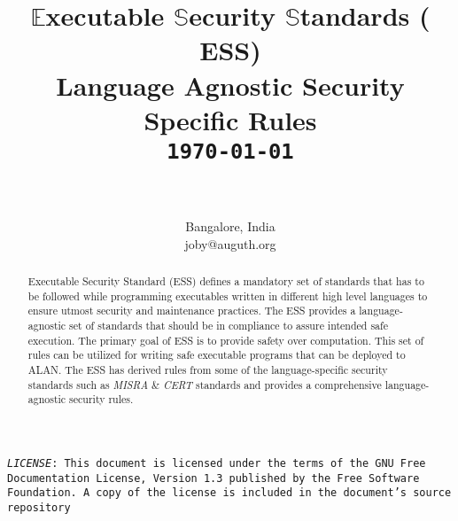 \documentclass[9pt]{IEEEtran} %
\begin{document}
\title{$\mathbb{E}$xecutable $\mathbb{S}$ecurity $\mathbb{S}$tandards (${\mathbf{ESS}}$) \\ \vspace{3mm} \normalsize{Language Agnostic Security Specific Rules} \vspace{2mm} \\ \textbf{\texttt{\today}} \vspace{1mm} }

\author{ \\
 \\
\normalsize{Bangalore, India \\
joby@auguth.org} \vspace{-5mm} \\
}

\maketitle

\normalsize

\begin{center}
\begin{spacing}{0.8}
\begin{justify}
\texttt{\scriptsize{\textit{LICENSE}: \texttt{This document is licensed under the terms of the GNU Free Documentation License, Version 1.3 published by the Free Software Foundation. A copy of the license is included in the document's source repository}}}
\end{justify}
\end{spacing}
\end{center}

\begin{abstract}
\small{
Executable Security Standard (ESS) defines a mandatory set of standards that has to be followed while programming executables written in different high level languages to ensure utmost security and maintenance practices. The ESS provides a language-agnostic set of standards that should be in compliance to assure intended safe execution. The primary goal of ESS is to provide safety over computation. This set of rules can be utilized for writing safe executable programs that can be deployed to ALAN. The ESS has derived rules from some of the language-specific security standards such as \textit{MISRA} \& \textit{CERT} standards and provides a comprehensive language-agnostic security rules.
}
\end{abstract}
\end{document}

